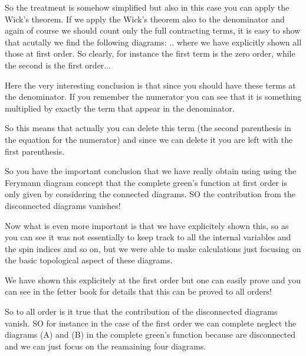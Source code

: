 \documentclass[../main/main.tex]{subfiles}
\begin{document}
So the treatment is somehow simplified but also in this case you can apply the Wick's theorem. If we apply the Wick's theorem also to the denominator and again of course we should count only the full contracting terms, it is easy to show that acutally we find the following diagrams:
..
where we have explicitly shown all those at first order.
So clearly, for instance the first term is the zero order, while the second is the first order...

Here the very interesting conclusion is that since you should have these terms at the denominator. If you remember the numerator you can see that it is something multiplied by exactly the term that appear in the denominator.

So this means that actually you can delete this term (the second parenthesis in the equation for the numerator) and since we can delete it you are left with the first parenthesis.

So you have the important conclusion that we have really obtain using using the Ferymann diagram concept that the complete green's function at first order is only given by considering the connected diagrams. SO the contribution from the disconnected diagrams vanishes!

Now what is even more important is that we have explicitely shown this, so as you can see it was not essentially to keep track to all the internal variables and the spin indices and so on, but we were able to make calculations just focusing on the basic topological aspect of these diagrams.


We have shown this explicitely at the first order but one can easily prove and you can see in the fetter book for details that this can be proved to all orders!

So to all order is it true that the contribution of the disconnected diagrams vanish. SO for instance in the case of the first order we can complete neglect the diagrams (A) and (B) in the complete green's function because are disconnected and we can just focus on the reamaining four diagrams. 
\end{document}
